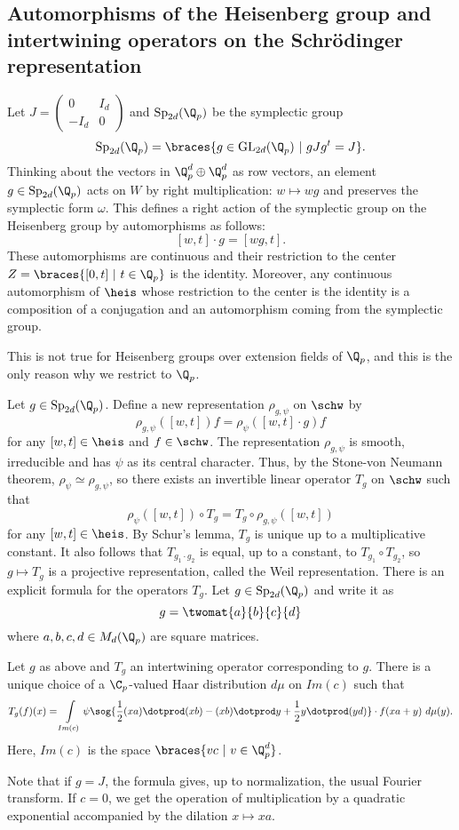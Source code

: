 \subsection{Automorphisms of the Heisenberg group and intertwining operators on the Schrödinger representation}
Let $J=\begin{pmatrix}0 & I_d\\ -I_d & 0 \end{pmatrix}$ and $\mathrm{Sp}_{2d}(\Q_p)$ be the symplectic group
\[\mathrm{Sp}_{2d}(\Q_p)=\braces{g\in \mathrm{GL}_{2d}(\Q_p)\ |\ gJg^t=J}.\]
Thinking about the vectors in $\Q_p^d\oplus\Q_p^d$ as row vectors, an element $g\in \mathrm{Sp}_{2d}(\Q_p)$ acts on $W$ by right multiplication: $w\mapsto wg$ and preserves the symplectic form $\omega$.
This defines a right action of the symplectic group on the Heisenberg group by automorphisms as follows:
\[[w,t]\cdot g=[wg,t].\]
These automorphisms are continuous and their restriction to the center $Z=\braces{[0,t]\ |\ t\in\Q_p}$ is the identity.
Moreover, any continuous automorphism of $\heis$ whose restriction to the center is the identity is a composition of a conjugation and an automorphism coming from the symplectic group.
    \begin{remark}
    This is not true for Heisenberg groups over extension fields of $\Q_p$, and this is the only reason why we restrict to $\Q_p$.
    \end{remark} 

Let $g\in \mathrm{Sp}_{2d}(\Q_p)$.
Define a new representation $\rho_{g,\psi}$ on $\schw$ by 
\[\rho_{g,\psi}([w,t])f=\rho_\psi([w,t]\cdot g)f\]
for any $[w,t]\in\heis$ and $f\in\schw$.
The representation $\rho_{g,\psi}$ is smooth, irreducible and has $\psi$ as its central character.
Thus, by the Stone-von Neumann theorem, $\rho_\psi\simeq \rho_{g,\psi}$, so there exists an invertible linear operator $T_g$ on $\schw$ such that 
\[ \rho_\psi([w,t])\circ T_g=T_g\circ\rho_{g,\psi}([w,t])\]
for any $[w,t]\in \heis$.
By Schur's lemma, $T_g$ is unique up to a multiplicative constant.
It also follows that $T_{g_1\cdot g_2}$ is equal, up to a constant, to $T_{g_1}\circ T_{g_2}$, so $g\mapsto T_g$ is a projective representation, called the Weil representation.
There is an explicit formula for the operators $T_g$.
Let $g\in \mathrm{Sp}_{2d}(\Q_p)$ and write it as 
\[g=\twomat{a}{b}{c}{d}\]
where $a,b,c,d\in M_d(\Q_p)$ are square matrices.
\begin{prop}\label{prop_intertwining_formula}
Let $g$ as above and $T_g$ an intertwining operator corresponding to $g$.
There is a unique choice of a $\C_p$-valued Haar distribution $d\mu$ on $Im(c)$ such that 
\[T_g(f)(x)=\intop_{Im(c)}\psi\sog{\frac{1}{2}(xa)\dotprod (xb)-(xb) \dotprod y+\frac{1}{2}y\dotprod (yd)}\cdot f(xa+y)\ d\mu(y).\]
Here, $Im(c)$ is the space $\braces{vc\ |\ v\in\Q_p^d}$.
\end{prop} 
Note that if $g=J$, the formula gives, up to normalization, the usual Fourier transform. 
If $c=0$, we get the operation of multiplication by a quadratic exponential accompanied by the dilation $x\mapsto xa$. 
